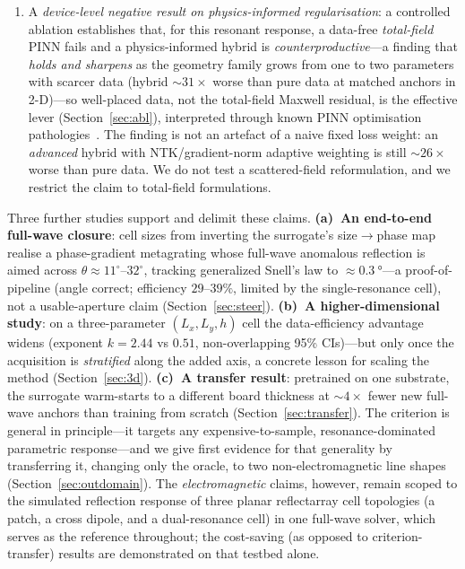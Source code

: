 \documentclass[11pt]{article}
\begin{document}
\begin{enumerate}
budgets---its advantage emerging precisely under the clustered active-learning anchors that global-kernel
models handle poorly---and its autodiff geometry gradients agree with full wave and drive a gradient-based
inverse-design loop on the testbed (Sections~\ref{sec:base}--\ref{sec:inv}).
\item A \emph{device-level negative result on physics-informed regularisation}: a controlled ablation
establishes that, for this resonant response, a data-free \emph{total-field} PINN fails and a
physics-informed hybrid is \emph{counterproductive}---a finding that \emph{holds and sharpens} as the
geometry family grows from one to two parameters with scarcer data (hybrid $\sim\!31\times$ worse than
pure data at matched anchors in 2-D)---so well-placed data, not the total-field Maxwell residual, is the
effective lever (Section~\ref{sec:abl}), interpreted through known PINN optimisation
pathologies~\cite{wang2021ntk,wanggrad2021}. The finding is not an artefact of a naive
fixed loss weight: an \emph{advanced} hybrid with NTK/gradient-norm adaptive weighting is still
$\sim\!26\times$ worse than pure data. We do not test a scattered-field reformulation, and we restrict the
claim to total-field formulations.
\end{enumerate}
Three further studies support and delimit these claims. \textbf{(a)~An end-to-end full-wave closure}: cell
sizes from inverting the surrogate's size$\to$phase map realise a phase-gradient metagrating whose full-wave
anomalous reflection is aimed across $\theta\approx11^\circ$--$32^\circ$, tracking generalized Snell's law to
$\approx\!\SI{0.3}{\degree}$---a proof-of-pipeline (angle correct; efficiency $29$--$39\%$, limited by the
single-resonance cell), not a usable-aperture claim (Section~\ref{sec:steer}). \textbf{(b)~A
higher-dimensional study}: on a three-parameter $(L_x,L_y,h)$ cell the data-efficiency advantage widens
(exponent $k\!=\!2.44$ vs $0.51$, non-overlapping 95\% CIs)---but only once the acquisition is
\emph{stratified} along the added axis, a concrete lesson for scaling the method (Section~\ref{sec:3d}).
\textbf{(c)~A transfer result}: pretrained on one substrate, the surrogate warm-starts to a different board
thickness at $\sim\!4\times$ fewer new full-wave anchors than training from scratch
(Section~\ref{sec:transfer}).
The criterion is general in principle---it targets any expensive-to-sample, resonance-dominated
parametric response---and we give first evidence for that generality by transferring it, changing only the
oracle, to two non-electromagnetic line shapes (Section~\ref{sec:outdomain}). The \emph{electromagnetic}
claims, however, remain scoped to the simulated reflection response of three planar reflectarray cell
topologies (a patch, a cross dipole, and a dual-resonance cell) in one full-wave solver, which serves as
the reference throughout; the cost-saving (as opposed to criterion-transfer) results are demonstrated on
that testbed alone.
\end{document}
